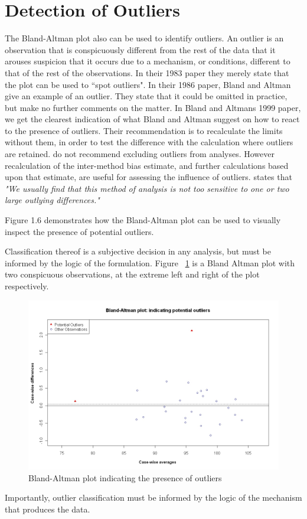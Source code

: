 \documentclass[12pt, a4paper]{report}
\theoremstyle{plain}
\theoremstyle{definition}
\theoremstyle{remark}
\begin{document}
\section{Detection of Outliers}
The Bland-Altman plot also can be used to identify outliers. An outlier is an observation that is conspicuously different from the rest of the data that it arouses suspicion that it occurs due to a mechanism, or conditions, different to that of the rest of the observations. In their 1983 paper they merely state that the plot can be used to
``spot outliers". In  their 1986 paper, Bland and Altman give an example of an
outlier. They state that it could be omitted in practice, but make
no further comments on the matter. In Bland and Altmans 1999 paper, we get the clearest indication of
what Bland and Altman suggest on how to react to the presence of
outliers. Their recommendation is to recalculate the limits
without them, in order to test the difference with the calculation
where outliers are retained. \citet*{BA99} do not recommend excluding outliers from analyses. However recalculation of the inter-method bias estimate, and further calculations based upon that estimate, are useful for assessing the influence of outliers. \citet{BA99} states that \emph{"We usually find that this method of analysis is not too sensitive to one or two large outlying differences."}
	
 Figure 1.6 demonstrates how the Bland-Altman plot can be used to visually inspect the presence of potential outliers.

Classification thereof is a subjective decision in any analysis, but must be informed by the logic of the formulation. Figure ~\ref{BAOutliers} is a Bland Altman plot with two
	conspicuous observations, at the extreme left and right of the
	plot respectively.
	
	
	\begin{figure}[h!]
		\begin{center}
			\includegraphics[width=125mm]{images/BAOutliers.jpeg}
			\caption{Bland-Altman plot indicating the presence of outliers}\label{BAOutliers}
		\end{center}
	\end{figure}
Importantly, outlier classification must be informed by the logic of the mechanism that produces the data. 
\end{document}
